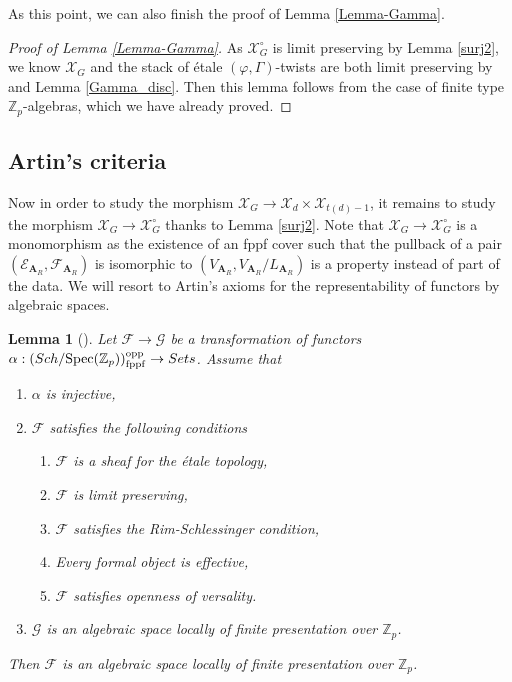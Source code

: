 \documentclass[10pt]{article}
\newtheorem{lem}[thm]{Lemma}
\numberwithin{equation}{section}
\newcommand{\bZ}{{\mathbb Z}}
\newcommand{\calE}{{\mathcal E}}
\newcommand{\calF}{{\mathcal F}}
\newcommand{\calG}{{\mathcal G}}
\newcommand{\calX}{{\mathcal X}}
\newcommand{\Spec}{{\mathrm{Spec}}}         %
\newcommand{\bfA}{{\textbf{A}}}
\begin{document}
As this point, we can also finish the proof of Lemma \ref{Lemma-Gamma}.
\begin{proof}[Proof of Lemma \ref{Lemma-Gamma}]
    As $\calX_G^{\circ}$ is limit preserving by Lemma \ref{surj2}, we know $\calX_G$ and the stack of \'etale $(\varphi,\Gamma)$-twists are both limit preserving by \cite[Lemma D.28]{EG22} and Lemma \ref{Gamma_disc}. Then this lemma follows from the case of finite type $\bZ_p$-algebras, which we have already proved.
\end{proof}



\subsection{Artin's criteria}
Now in order to study the morphism $\calX_G\to \calX_d\times \calX_{t(d)-1}$, it remains to study the morphism $\calX_G\to \calX_G^{\circ}$ thanks to Lemma \ref{surj2}. Note that $\calX_G\to \calX_G^{\circ}$ is a monomorphism as the existence of an fppf cover such that the pullback of a pair $(\calE_{\bfA_R},\calF_{\bfA_R})$ is isomorphic to $(V_{\bfA_R},V_{\bfA_R}/L_{\bfA_R})$ is a property instead of part of the data.  We will resort to Artin's axioms for the representability of functors by
algebraic spaces. 

\begin{lem}[{\cite[\href{https://stacks.math.columbia.edu/tag/07Y2}{Tag 07Y2}]{stacks-project}}]\label{artin}
    Let $\calF\to \calG$ be a transformation of functors $\alpha:(Sch/\Spec(\bZ_p))^{\rm opp}_{\rm fppf}\to Sets$. Assume that
    \begin{enumerate}
        \item $\alpha$ is injective,
        \item $\calF$ satisfies the following conditions
        \begin{enumerate}
            \item $\calF$ is a sheaf for the \'etale topology,
            \item $\calF$ is limit preserving,
            \item $\calF$ satisfies the Rim-Schlessinger condition,
            \item Every formal object is effective,
            \item $\calF$ satisfies openness of versality.
        \end{enumerate}
        \item $\calG$ is an algebraic space locally of finite presentation over $\bZ_p$.
    \end{enumerate}
    Then $\calF$ is an algebraic space locally of finite presentation over $\bZ_p$.
\end{lem}
\end{document}
